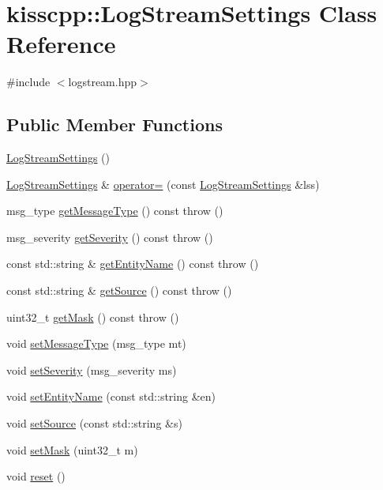 \hypertarget{classkisscpp_1_1_log_stream_settings}{\section{kisscpp\-:\-:Log\-Stream\-Settings Class Reference}
\label{classkisscpp_1_1_log_stream_settings}
}


{\ttfamily \#include $<$logstream.\-hpp$>$}

\subsection*{Public Member Functions}
\begin{DoxyCompactItemize}
\item 
\hyperlink{classkisscpp_1_1_log_stream_settings_ae0d0e39dbc8875294d0b28579138bdd5}{Log\-Stream\-Settings} ()
\item 
\hyperlink{classkisscpp_1_1_log_stream_settings}{Log\-Stream\-Settings} \& \hyperlink{classkisscpp_1_1_log_stream_settings_ac0fcc9f978329329f027a251620fe3d2}{operator=} (const \hyperlink{classkisscpp_1_1_log_stream_settings}{Log\-Stream\-Settings} \&lss)
\item 
msg\-\_\-type \hyperlink{classkisscpp_1_1_log_stream_settings_a2fe791c9f50407c15c7258a085c77a71}{get\-Message\-Type} () const   throw ()
\item 
msg\-\_\-severity \hyperlink{classkisscpp_1_1_log_stream_settings_a797caa3f716ffbcf7e5eb1dd667c86a6}{get\-Severity} () const   throw ()
\item 
const std\-::string \& \hyperlink{classkisscpp_1_1_log_stream_settings_a96e829a671c13d1895f64ea34735140f}{get\-Entity\-Name} () const   throw ()
\item 
const std\-::string \& \hyperlink{classkisscpp_1_1_log_stream_settings_a80153606d7e53c45cb3a05a99d770fb2}{get\-Source} () const   throw ()
\item 
uint32\-\_\-t \hyperlink{classkisscpp_1_1_log_stream_settings_ae82b178a57c244164c9c259fefcc218a}{get\-Mask} () const   throw ()
\item 
void \hyperlink{classkisscpp_1_1_log_stream_settings_a2e5a93a55880481039f26edf33777c32}{set\-Message\-Type} (msg\-\_\-type mt)
\item 
void \hyperlink{classkisscpp_1_1_log_stream_settings_a71d8ced13cd2a4a0e0ec266cfd86b304}{set\-Severity} (msg\-\_\-severity ms)
\item 
void \hyperlink{classkisscpp_1_1_log_stream_settings_a147829d31ae248a3b510d7f721fc4891}{set\-Entity\-Name} (const std\-::string \&en)
\item 
void \hyperlink{classkisscpp_1_1_log_stream_settings_ac370b7ef8b02c76c2f0ddb7f9d2e1930}{set\-Source} (const std\-::string \&s)
\item 
void \hyperlink{classkisscpp_1_1_log_stream_settings_a9d56dd2574f403d624d527a23159d123}{set\-Mask} (uint32\-\_\-t m)
\item 
void \hyperlink{classkisscpp_1_1_log_stream_settings_ab7f41d86de63b83115c465f64909835e}{reset} ()
\end{DoxyCompactItemize}


